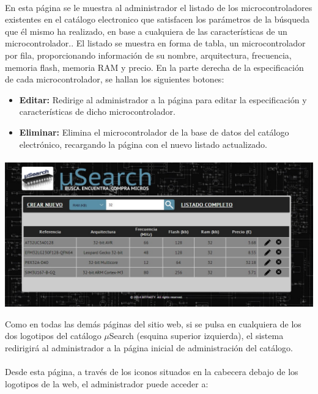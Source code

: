 \paragraph{}En esta página se le muestra al administrador el listado de los microcontroladores existentes en el catálogo electronico que satisfacen los parámetros de la búsqueda que él mismo ha realizado, en base a cualquiera de las características de un microcontrolador.. El listado se muestra en forma de tabla, un microcontrolador por fila, proporcionando información de su nombre, arquitectura, frecuencia, memoria flash, memoria RAM y precio. En la parte derecha de la especificación de cada microcontrolador, se hallan los siguientes botones:
\begin{itemize}
	\item \textbf{Editar:} Redirige al administrador a la página para editar la especificación y características de dicho microcontrolador.
	\item \textbf{Eliminar:} Elimina el microcontrolador de la base de datos del catálogo electrónico, recargando la página con el nuevo listado actualizado.
\end{itemize}

\begin{center}
	\paragraph{}\includegraphics[scale=0.35]{img/listado_busqueda_admin}\singlelinebreak
\end{center}

Como en todas las demás páginas del sitio web, si se pulsa en cualquiera de los dos logotipos del catálogo $\mu$Search (esquina superior izquierda), el sistema redirigirá al administrador a la página inicial de administración del catálogo.

\paragraph{}Desde esta página, a través de los iconos situados en la cabecera debajo de los logotipos de la web, el administrador puede acceder a:

